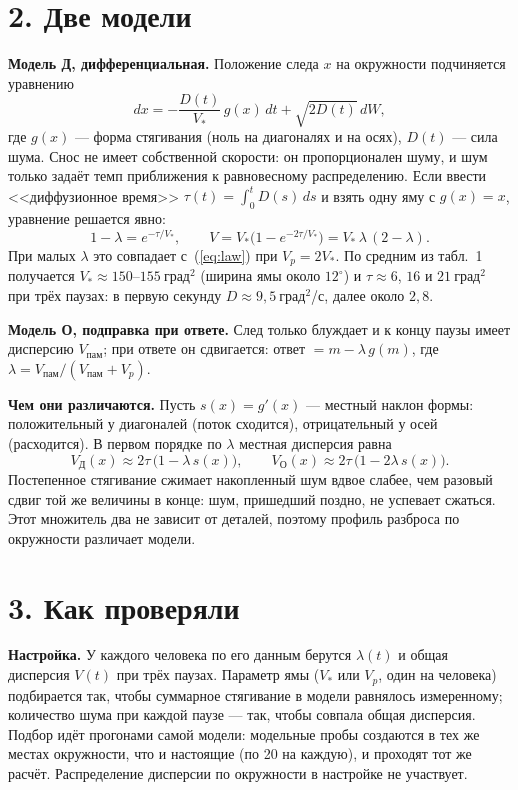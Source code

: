 \documentclass[10pt,a4paper]{article}
\newcommand{\gr}{^{\circ}}
\newcommand{\dsq}{\text{град}^2}
\begin{document}
\section*{2. Две модели}

\textbf{Модель Д, дифференциальная.} Положение следа $x$ на окружности подчиняется уравнению
\begin{equation}
dx=-\frac{D(t)}{V_*}\,g(x)\,dt+\sqrt{2D(t)}\,dW ,
\label{eq:sde}
\end{equation}
где $g(x)$ --- форма стягивания (ноль на диагоналях и на осях), $D(t)$ --- сила шума. Снос не имеет собственной
скорости: он пропорционален шуму, и шум только задаёт темп приближения к равновесному распределению. Если ввести
<<диффузионное время>> $\tau(t)=\int_0^t D(s)\,ds$ и взять одну яму с $g(x)=x$, уравнение решается явно:
\begin{equation}
1-\lambda=e^{-\tau/V_*},\qquad V=V_*\bigl(1-e^{-2\tau/V_*}\bigr)=V_*\,\lambda\,(2-\lambda).
\label{eq:ou}
\end{equation}
При малых $\lambda$ это совпадает с~(\ref{eq:law}) при $V_p=2V_*$. По средним из табл.~1 получается
$V_*\approx150$--$155~\dsq$ (ширина ямы около $12\gr$) и $\tau\approx 6$, $16$ и $21~\dsq$ при трёх паузах: в первую
секунду $D\approx 9{,}5~\dsq$/с, далее около $2{,}8$.

\textbf{Модель О, подправка при ответе.} След только блуждает и к концу паузы имеет дисперсию $V_{\text{пам}}$; при
ответе он сдвигается: ответ $=m-\lambda\,g(m)$, где $\lambda=V_{\text{пам}}/(V_{\text{пам}}+V_p)$.

\textbf{Чем они различаются.} Пусть $s(x)=g'(x)$ --- местный наклон формы: положительный у диагоналей (поток
сходится), отрицательный у осей (расходится). В первом порядке по $\lambda$ местная дисперсия равна
\begin{equation}
V_{\text{Д}}(x)\approx 2\tau\,\bigl(1-\lambda\,s(x)\bigr),\qquad
V_{\text{О}}(x)\approx 2\tau\,\bigl(1-2\lambda\,s(x)\bigr).
\label{eq:two}
\end{equation}
Постепенное стягивание сжимает накопленный шум вдвое слабее, чем разовый сдвиг той же величины в конце: шум, пришедший
поздно, не успевает сжаться. Этот множитель два не зависит от деталей, поэтому профиль разброса по окружности
различает модели.

\section*{3. Как проверяли}

\textbf{Настройка.} У каждого человека по его данным берутся $\lambda(t)$ и общая дисперсия $V(t)$ при трёх паузах.
Параметр ямы ($V_*$ или $V_p$, один на человека) подбирается так, чтобы суммарное стягивание в модели равнялось
измеренному; количество шума при каждой паузе --- так, чтобы совпала общая дисперсия. Подбор идёт прогонами самой
модели: модельные пробы создаются в тех же местах окружности, что и настоящие (по 20 на каждую), и проходят тот же
расчёт. Распределение дисперсии по окружности в настройке не участвует.
\end{document}

